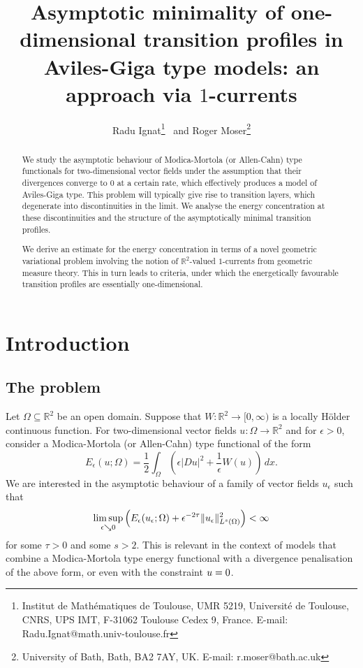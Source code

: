 \documentclass[a4paper]{article}
\newcommand{\R}{\mathbb{R}}
\let\div\relax\DeclareMathOperator{\div}{div}
\theoremstyle{definition}
\theoremstyle{remark}
\begin{document}
\title{Asymptotic minimality of one-dimensional transition profiles in Aviles-Giga type models: an approach via $1$-currents}

\author{Radu Ignat\footnote{Institut de Math\'ematiques de Toulouse, UMR 5219, Universit\'e de Toulouse,
CNRS, UPS IMT, F-31062 Toulouse Cedex 9, France. E-mail: Radu.Ignat@math.univ-toulouse.fr} \ 
and Roger Moser\footnote{University of Bath, Bath, BA2 7AY, UK. E-mail: r.moser@bath.ac.uk}}

\maketitle



\begin{abstract}
We study the asymptotic behaviour
of Modica-Mortola (or Allen-Cahn) type functionals for two-dimensional
vector fields under the assumption that their divergences converge to $0$ at a certain rate,
which effectively produces a model of Aviles-Giga type. This problem will typically give
rise to transition layers, which degenerate into discontinuities in the limit.
We analyse the energy concentration at these discontinuities and the structure
of the asymptotically minimal transition profiles.

We derive an estimate for the energy concentration in terms of a novel
geometric variational problem involving the notion of $\R^2$-valued $1$-currents
from geometric measure theory. This in turn leads to criteria, under which
the energetically favourable transition profiles are essentially one-dimensional.
\end{abstract}


\section{Introduction}

\subsection{The problem}

Let $\Omega \subseteq \R^2$ be an open domain. Suppose that
$W \colon \R^2 \to [0, \infty)$ is a locally H\"older continuous function. For
two-dimensional vector fields $u \colon \Omega \to \R^2$ and for $\epsilon > 0$,
consider a Modica-Mortola (or Allen-Cahn) type functional of the form
\[
E_\epsilon(u; \Omega) = \frac{1}{2} \int_\Omega \left(\epsilon |D u|^2 + \frac{1}{\epsilon} W(u)\right) \, dx.
\]
We are interested in the asymptotic behaviour of a family of vector fields
$u_\epsilon$ such that
\begin{equation} \label{eq:energy-and-divergence}
\limsup_{\epsilon \searrow 0} \left(E_\epsilon(u_\epsilon; \Omega) + \epsilon^{-2\tau} \|\div u_\epsilon\|_{L^s(\Omega)}^2\right) < \infty
\end{equation}
for some $\tau > 0$ and some $s > 2$. This is relevant in the context of
models that combine a Modica-Mortola type energy functional with a divergence
penalisation of the above form, or even with the constraint $\div u = 0$.
\end{document}
